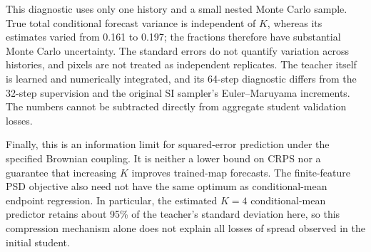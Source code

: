 This diagnostic uses only one history and a small nested Monte Carlo sample. True total conditional forecast variance is independent of $K$, whereas its estimates varied from 0.161 to 0.197; the fractions therefore have substantial Monte Carlo uncertainty. The standard errors do not quantify variation across histories, and pixels are not treated as independent replicates. The teacher itself is learned and numerically integrated, and its 64-step diagnostic differs from the 32-step supervision and the original SI sampler's Euler--Maruyama increments. The numbers cannot be subtracted directly from aggregate student validation losses.

Finally, this is an information limit for squared-error prediction under the specified Brownian coupling. It is neither a lower bound on CRPS nor a guarantee that increasing $K$ improves trained-map forecasts. The finite-feature PSD objective also need not have the same optimum as conditional-mean endpoint regression. In particular, the estimated $K=4$ conditional-mean predictor retains about 95\% of the teacher's standard deviation here, so this compression mechanism alone does not explain all losses of spread observed in the initial student.

